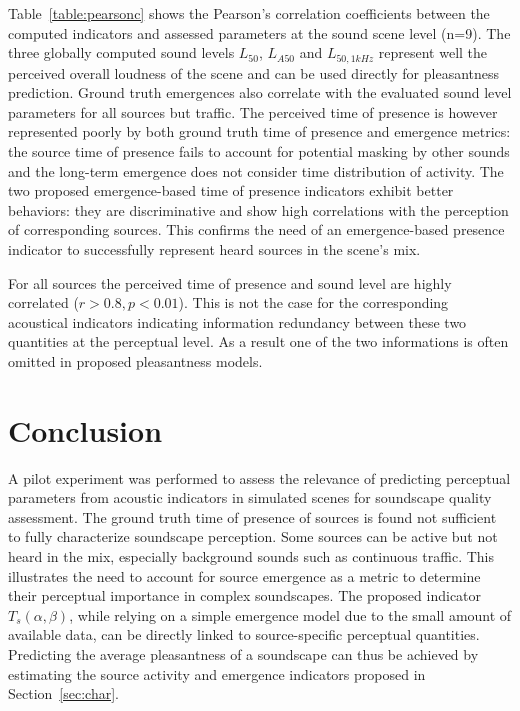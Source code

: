 \documentclass{article}
\begin{document}
\begin{sloppy}
Table~\ref{table:pearsonc} shows the Pearson's correlation coefficients between the computed indicators and assessed parameters at the sound scene level (n=9). The three globally computed sound levels $L_{50}$, $L_{A50}$ and $L_{50,1kHz}$ represent well the perceived overall loudness of the scene and can be used directly for pleasantness prediction. Ground truth emergences also correlate with the evaluated sound level parameters for all sources but traffic. The perceived time of presence is however represented poorly by both ground truth time of presence and emergence metrics: the source time of presence fails to account for potential masking by other sounds and the long-term emergence does not consider time distribution of activity. The two proposed emergence-based time of presence indicators exhibit better behaviors: they are discriminative and show high correlations with the perception of corresponding sources. This confirms the need of an emergence-based presence indicator to successfully represent heard sources in the scene's mix.

For all sources the perceived time of presence and sound level are highly correlated ($r>0.8, p<0.01$). This is not the case for the corresponding acoustical indicators indicating information redundancy between these two quantities at the perceptual level. As a result one of the two informations is often omitted in proposed pleasantness models.

\section{Conclusion}
\label{sec:disc}

A pilot experiment was performed to assess the relevance of predicting perceptual parameters from acoustic indicators in simulated scenes for soundscape quality assessment. The ground truth time of presence of sources is found not sufficient to fully characterize soundscape perception. Some sources can be active but not heard in the mix, especially background sounds such as continuous traffic. This illustrates the need to account for source emergence as a metric to determine their perceptual importance in complex soundscapes. The proposed indicator $T_s(\alpha, \beta)$, while relying on a simple emergence model due to the small amount of available data, can be directly linked to source-specific perceptual quantities. Predicting the average pleasantness of a soundscape can thus be achieved by estimating the source activity and emergence indicators proposed in Section~\ref{sec:char}.


\end{sloppy}
\end{document}
